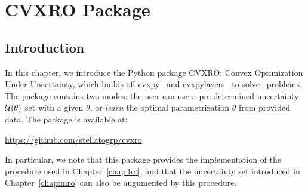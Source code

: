 \chapter{CVXRO Package}
\label{chap:cvxro}



\section{Introduction}
\label{sec:cvxro}
In this chapter, we introduce the Python package CVXRO: Convex Optimization Under Uncertainty, which builds off cvxpy~\cite{diamond2016cvxpy} and cvxpylayers~\cite{cvxpylayers2019} to solve~ problems. The package contains two modes: the user can use a pre-determined uncertainty ${\mathcal{U}}(\theta)$ set with a given $\theta$, or {\it learn} the optimal parametrization $\theta$ from provided data. The package is available at:
\begin{center}
	\url{https://github.com/stellatogrp/cvxro}.
\end{center} 
In particular, we note that this package provides the implementation of the procedure used in Chapter~\ref{chap:lro}, and that the uncertainty set introduced in Chapter~\ref{chap:mro} can also be augumented by this procedure. 

